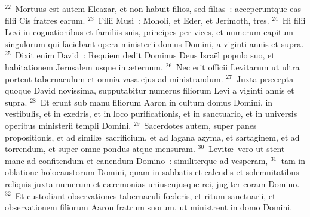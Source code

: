 ${}^{22}$~Mortuus est autem Eleazar, et non habuit filios, sed filias~: acceperuntque eas filii Cis fratres earum.
${}^{23}$~Filii Musi~: Moholi, et Eder, et Jerimoth, tres.
${}^{24}$~Hi filii Levi in cognationibus et familiis suis, principes per vices, et numerum capitum singulorum qui faciebant opera ministerii domus Domini, a viginti annis et supra.
${}^{25}$~Dixit enim David~: Requiem dedit Dominus Deus Isra\"el populo suo, et habitationem Jerusalem usque in \ae ternum.
${}^{26}$~Nec erit officii Levitarum ut ultra portent tabernaculum et omnia vasa ejus ad ministrandum.
${}^{27}$~Juxta pr\ae cepta quoque David novissima, supputabitur numerus filiorum Levi a viginti annis et supra.
${}^{28}$~Et erunt sub manu filiorum Aaron in cultum domus Domini, in vestibulis, et in exedris, et in loco purificationis, et in sanctuario, et in universis operibus ministerii templi Domini.
${}^{29}$~Sacerdotes autem, super panes propositionis, et ad simil\ae\ sacrificium, et ad lagana azyma, et sartaginem, et ad torrendum, et super omne pondus atque mensuram.
${}^{30}$~Levit\ae\ vero ut stent mane ad confitendum et canendum Domino~: similiterque ad vesperam,
${}^{31}$~tam in oblatione holocaustorum Domini, quam in sabbatis et calendis et solemnitatibus reliquis juxta numerum et c\ae remonias uniuscujusque rei, jugiter coram Domino.
${}^{32}$~Et custodiant observationes tabernaculi fœderis, et ritum sanctuarii, et observationem filiorum Aaron fratrum suorum, ut ministrent in domo Domini.

